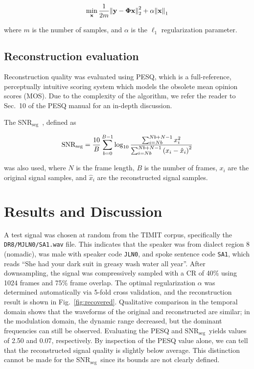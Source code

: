 \documentclass[10pt,a4paper,twoside]{article}
\newcommand{\snrseg}{SNR$_{\mathrm{seg}}$}
\begin{document}
\begin{equation}\label{eq:lasso}
	\min_{\text{\bfseries x}} \frac{1}{2m} \norm{\text{\bfseries y} - \bm\Phi \text{\bfseries x}}_2^2 + \alpha\norm{\text{\bfseries x}}_1
\end{equation}

\noindent where $m$ is the number of samples, and $\alpha$ is the $\ell_1$ regularization parameter.

\subsection{Reconstruction evaluation}\label{ssec:eval}
Reconstruction quality was evaluated using PESQ, which is a full-reference, perceptually intuitive scoring system which models the obsolete mean opinion scores (MOS). Due to the complexity of the algorithm, we refer the reader to Sec.~10 of the PESQ manual \cite{pesq} for an in-depth discussion.

The \snrseg~, defined as

\begin{equation}\label{eq:snrseg}
	\mathrm{SNR_{seg}} = \frac{10}{B} \sum_{b=0}^{B-1} \log_{10} \frac{\sum_{i=Nb}^{Nb+N-1} x_i^2}{\sum_{i=Nb}^{Nb+N-1} \qty(x_i - \hat{x}_i)^2}
\end{equation}

\noindent was also used, where $N$ is the frame length, $B$ is the number of frames, $x_i$ are  the original signal samples, and $\hat{x}_i$ are the reconstructed signal samples.


\section{Results and Discussion}
A test signal was chosen at random from the TIMIT corpus, specifically the \texttt{DR8/MJLN0/SA1.wav} file. This indicates that the speaker was from dialect region 8 (nomadic), was male with speaker code \texttt{JLN0}, and spoke sentence code \texttt{SA1}, which reads ``She had your dark suit in greasy wash water all year''. After downsampling, the signal was compressively sampled with a CR of 40\% using 1024 frames and 75\% frame overlap. The optimal regularization $\alpha$ was determined automatically via 5-fold cross validation, and the reconstruction result is shown in Fig.~\ref{fig:recovered}. Qualitative comparison in the temporal domain shows that the waveforms of the original and reconstructed are similar; in the modulation domain, the dynamic range decreased, but the dominant frequencies can still be observed. Evaluating the PESQ and \snrseg~yields values of 2.50 and 0.07, respectively. By inspection of the PESQ value alone, we can tell that the reconstructed signal quality is slightly below average. This distinction cannot be made for the \snrseg~since its bounds are not clearly defined.
\end{document}
